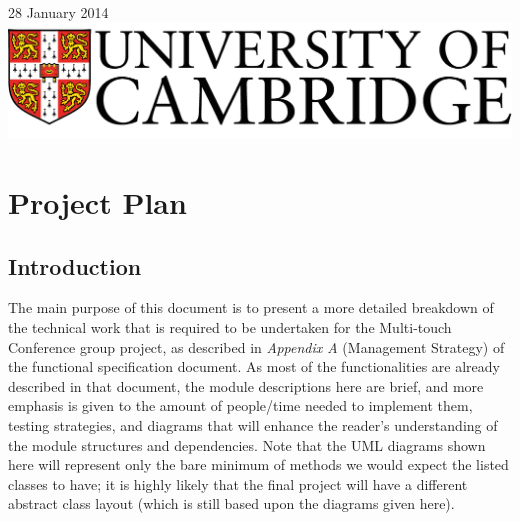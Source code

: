 \documentclass[12p, a4paper, onecolumn]{report}
\begin{document}
\begin{titlepage}

{\large 28 January 2014}\\[3cm] %


\includegraphics{logo.png}\\[1cm] %
 

\vfill %

\end{titlepage}

\setcounter{page}{1}

\tableofcontents

\newpage

\setcounter{page}{1}

\chapter{Project Plan}

\section{Introduction}

The main purpose of this document is to present a more detailed breakdown of the technical work that is required to be undertaken for the Multi-touch Conference group project, as described in \emph{Appendix A} (Management Strategy) of the functional specification document. As most of the functionalities are already described in that document, the module descriptions here are brief, and more emphasis is given to the amount of people/time needed to implement them, testing strategies, and diagrams that will enhance the reader’s understanding of the module structures and dependencies. Note that the UML diagrams shown here will represent only the bare minimum of methods we would expect the listed classes to have; it is highly likely that the final project will have a different abstract class layout (which is still based upon the diagrams given here).
\end{document}
